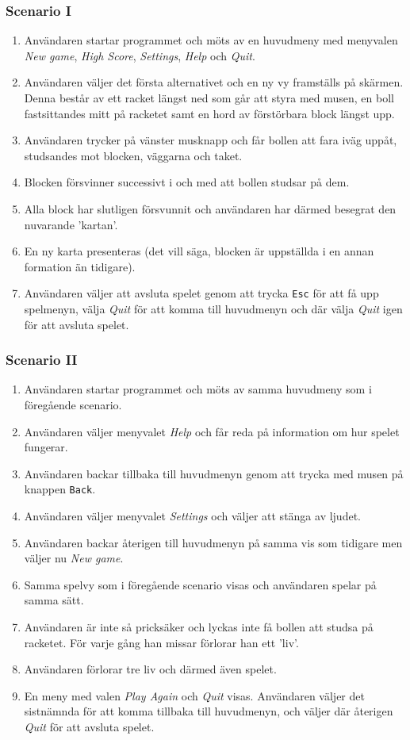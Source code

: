 \documentclass[11pt,a4paper]{article}
\begin{document}
\subsubsection{Scenario I}
\begin{enumerate}
	\item Användaren startar programmet och möts av en huvudmeny med menyvalen \emph{New game}, \emph{High Score}, \emph{Settings}, \emph{Help} och \emph{Quit}.
	\item Användaren väljer det första alternativet och en ny vy framställs på skärmen. Denna består av ett racket längst ned som går att styra med musen, en boll fastsittandes mitt på racketet samt en hord av förstörbara block längst upp.
	\item Användaren trycker på vänster musknapp och får bollen att fara iväg uppåt, studsandes mot blocken, väggarna och taket.
	\item Blocken försvinner successivt i och med att bollen studsar på dem.
	\item Alla block har slutligen försvunnit och användaren har därmed besegrat den nuvarande 'kartan'.
	\item En ny karta presenteras (det vill säga, blocken är uppställda i en annan formation än tidigare).
	\item Användaren väljer att avsluta spelet genom att trycka \texttt{Esc} för att få upp spelmenyn, välja \emph{Quit} för att komma till huvudmenyn och där välja \emph{Quit} igen för att avsluta spelet.
\end{enumerate}

\subsubsection{Scenario II}
\begin{enumerate}
	\item Användaren startar programmet och möts av samma huvudmeny som i föregående scenario.
	\item Användaren väljer menyvalet \emph{Help} och får reda på information om hur spelet fungerar.
	\item Användaren backar tillbaka till huvudmenyn genom att trycka med musen på knappen \texttt{Back}.
	\item Användaren väljer menyvalet \emph{Settings} och väljer att stänga av ljudet.
	\item Användaren backar återigen till huvudmenyn på samma vis som tidigare men väljer nu \emph{New game}.
	\item Samma spelvy som i föregående scenario visas och användaren spelar på samma sätt.
	\item Användaren är inte så pricksäker och lyckas inte få bollen att studsa på racketet. För varje gång han missar förlorar han ett 'liv'.
	\item Användaren förlorar tre liv och därmed även spelet.
	\item En meny med valen \emph{Play Again} och \emph{Quit} visas. Användaren väljer det sistnämnda för att komma tillbaka till huvudmenyn, och väljer där återigen \emph{Quit} för att avsluta spelet.
\end{enumerate}
\end{document}
